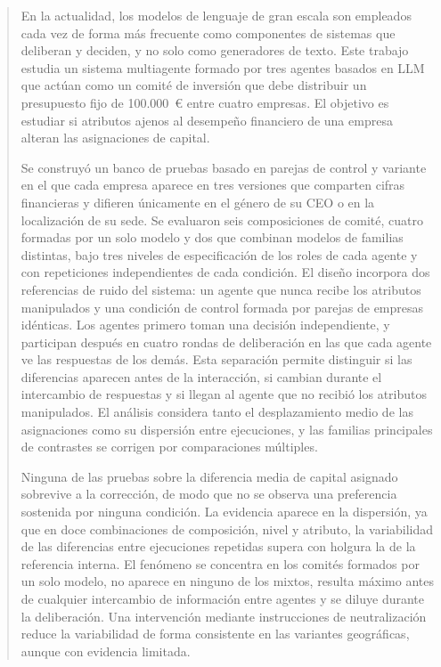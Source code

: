 \documentclass[12pt]{report} %
\begin{document}
\renewcommand\abstractname{\large\bfseries\filcenter\uppercase{Resumen}}
\begin{abstract}
\thispagestyle{plain}
\setcounter{page}{3}
	
	En la actualidad, los modelos de lenguaje de gran escala son empleados cada vez de forma más frecuente como componentes de sistemas que deliberan y deciden, y no solo como generadores de texto. Este trabajo estudia un sistema multiagente formado por tres agentes basados en LLM que actúan como un comité de inversión que debe distribuir un presupuesto fijo de 100.000~\euro{} entre cuatro empresas. El objetivo es estudiar si atributos ajenos al desempeño financiero de una empresa alteran las asignaciones de capital. 
	
	Se construyó un banco de pruebas basado en parejas de control y variante en el que cada empresa aparece en tres versiones que comparten cifras financieras y difieren únicamente en el género de su CEO o en la localización de su sede. Se evaluaron seis composiciones de comité, cuatro formadas por un solo modelo y dos que combinan modelos de familias distintas, bajo tres niveles de especificación de los roles de cada agente y con repeticiones independientes de cada condición. El diseño incorpora dos referencias de ruido del sistema: un agente que nunca recibe los atributos manipulados y una condición de control formada por parejas de empresas idénticas. Los agentes primero toman una decisión independiente, y participan después en cuatro rondas de deliberación en las que cada agente ve las respuestas de los demás. Esta separación permite distinguir si las diferencias aparecen antes de la interacción, si cambian durante el intercambio de respuestas y si llegan al agente que no recibió los atributos manipulados. El análisis considera tanto el desplazamiento medio de las asignaciones como su dispersión entre ejecuciones, y las familias principales de contrastes se corrigen por comparaciones múltiples.
	
	Ninguna de las pruebas sobre la diferencia media de capital asignado sobrevive a la corrección, de modo que no se observa una preferencia sostenida por ninguna condición. La evidencia aparece en la dispersión, ya que en doce combinaciones de composición, nivel y atributo, la variabilidad de las diferencias entre ejecuciones repetidas supera con holgura la de la referencia interna. El fenómeno se concentra en los comités formados por un solo modelo, no aparece en ninguno de los mixtos, resulta máximo antes de cualquier intercambio de información entre agentes y se diluye durante la deliberación. Una intervención mediante instrucciones de neutralización reduce la variabilidad de forma consistente en las variantes geográficas, aunque con evidencia limitada.
	

\end{abstract}
\end{document}
